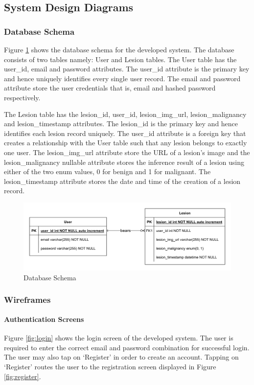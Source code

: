 \documentclass[12pt, a4paper]{article}
\begin{document}
\subsection{System Design Diagrams}
\subsubsection{Database Schema}
Figure \ref{fig:db-schema} shows the database schema for the developed system. The database consists of two tables namely: User and Lesion tables. The User table has the user\_id, email and password attributes. The user\_id attribute is the primary key and hence uniquely identifies every single user record. The email and password attribute store the user credentials that is, email and hashed password respectively.

The Lesion table has the lesion\_id, user\_id, lesion\_img\_url, lesion\_malignancy and lesion\_timestamp attributes. The lesion\_id is the primary key and hence identifies each lesion record uniquely. The user\_id attribute is a foreign key that creates a relationship with the User table such that any lesion belongs to exactly one user. The lesion\_img\_url attribute store the URL of a lesion's image and the lesion\_malignancy nullable attribute stores the inference result of a lesion using either of the two enum values, 0 for benign and 1 for malignant. The lesion\_timestamp attribute stores the date and time of the creation of a lesion record.

\begin{figure}[h]
    \centering
    \setlength{\fboxsep}{8pt}
    \includegraphics[scale=0.12, fbox]{db-schema.png}
    \caption{Database Schema}
    \label{fig:db-schema}
\end{figure}
\subsubsection{Wireframes}
\paragraph{Authentication Screens}
Figure \ref{fig:login} shows the login screen of the developed system. The user is required to enter the correct email and password combination for successful login. The user may also tap on `Register' in order to create an account. Tapping on `Register' routes the user to the registration screen displayed in Figure \ref{fig:register}.
\end{document}
